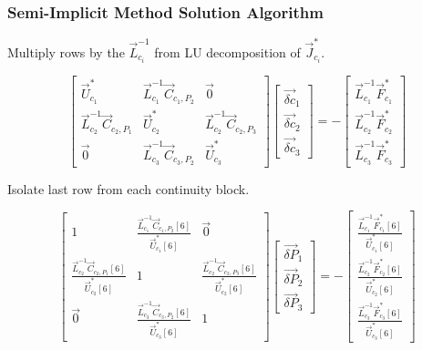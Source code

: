 \documentclass[compress,xcolor=table]{beamer}
\begin{document}
\begin{frame}
\frametitle{Semi-Implicit Method Solution Algorithm}

Multiply rows by the $\vec{L}^{-1}_{c_i}$ from LU decomposition of $\vec{J}^{*}_{c_i}$.

\begin{equation*}
\begin{bmatrix} 
\vec{U}^{*}_{c_1} & \vec{L}^{-1}_{c_1}\vec{C}_{c_1,P_2} & \vec{0} \\
\vec{L}^{-1}_{c_2}\vec{C}_{c_2,P_1} & \vec{U}^{*}_{c_2} & \vec{L}^{-1}_{c_2}\vec{C}_{c_2,P_3} \\
\vec{0} & \vec{L}^{-1}_{c_3}\vec{C}_{c_3,P_2} & \vec{U}^{*}_{c_3}
\end{bmatrix} \begin{bmatrix}
\vec{\delta c}_{1} \\
\vec{\delta c}_{2} \\
\vec{\delta c}_{3}
\end{bmatrix}  = -\begin{bmatrix}
\vec{L}^{-1}_{c_1}\vec{F}^{*}_{c_1} \\
\vec{L}^{-1}_{c_2}\vec{F}^{*}_{c_2} \\
\vec{L}^{-1}_{c_3}\vec{F}^{*}_{c_3}
\end{bmatrix}
\end{equation*}

Isolate last row from each continuity block.

\begin{equation*}
\begin{bmatrix} 
 1 & \frac{\vec{L}^{-1}_{c_1}\vec{C}_{c_1,P_2}[6]}{\vec{U}^{*}_{c_1}[6]} & \vec{0} \\
\frac{\vec{L}^{-1}_{c_2}\vec{C}_{c_2,P_1}[6]}{\vec{U}^{*}_{c_2}[6]} & 1 & \frac{\vec{L}^{-1}_{c_2}\vec{C}_{c_2,P_3}[6]}{\vec{U}^{*}_{c_2}[6]} \\
\vec{0}           & \frac{\vec{L}^{-1}_{c_3}\vec{C}_{c_3,P_2}[6]}{\vec{U}^{*}_{c_3}[6]} & 1
\end{bmatrix} \begin{bmatrix}
\vec{\delta P}_{1} \\
\vec{\delta P}_{2} \\
\vec{\delta P}_{3}
\end{bmatrix}  = -\begin{bmatrix}
\frac{\vec{L}^{-1}_{c_1}\vec{F}^{*}_{c_1}[6]}{\vec{U}^{*}_{c_1}[6]} \\
\frac{\vec{L}^{-1}_{c_2}\vec{F}^{*}_{c_2}[6]}{\vec{U}^{*}_{c_2}[6]} \\
\frac{\vec{L}^{-1}_{c_3}\vec{F}^{*}_{c_3}[6]}{\vec{U}^{*}_{c_3}[6]}
\end{bmatrix}
\end{equation*}

\end{frame}
\end{document}
